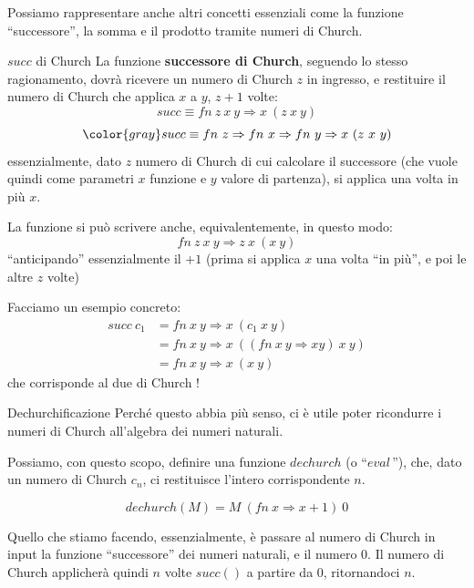 \documentclass[a4paper,11pt]{report}
\begin{document}
Possiamo rappresentare anche altri concetti essenziali come la funzione ``successore'', la somma e il prodotto tramite numeri di Church.

\begin{defframe}{\( succ \) di Church}{}
    La funzione \textbf{successore di Church}, seguendo lo stesso ragionamento, dovrà ricevere un numero di Church \( z \) in ingresso, e restituire il numero di Church che applica \( x \) a \( y \), \( z+1 \) volte:
    \[ succ \equiv fn \ z \ x \ y \Rightarrow x\ (z \ x \ y) \]
    \[\color{gray} succ \equiv fn \ z \Rightarrow fn \ x \Rightarrow fn \ y \Rightarrow x\ (z \ x \ y) \]
    essenzialmente, dato \( z \) numero di Church di cui calcolare il successore (che vuole quindi come parametri \( x \) funzione e \( y \) valore di partenza), si applica una volta in più \( x \).

    La funzione si può scrivere anche, equivalentemente, in questo modo:
    \[ fn \ z \ x \ y \Rightarrow z \ x \ (x \ y) \]
    ``anticipando'' essenzialmente il \( +1 \) (prima si applica \( x \) una volta ``in più'', e poi le altre \( z \) volte)
\end{defframe}

Facciamo un esempio concreto:
\begin{align*}
    succ \ c_1 &= fn \ x \ y \Rightarrow x \ (c_1 \ x \ y) \\
               & = fn \ x \ y \Rightarrow x \ (( fn \ x \ y \Rightarrow xy) \ x \ y ) \\
               & = fn \ x \ y \Rightarrow x \ ( x \ y)
\end{align*}
che corrisponde al due di Church !

\begin{defframe}{Dechurchificazione}{}
    Perché questo abbia più senso, ci è utile poter ricondurre i numeri di Church all'algebra dei numeri naturali.
    
    Possiamo, con questo scopo, definire una funzione \( dechurch \) (o ``\( eval \,\)''), che, dato un numero di Church \( c_n \), ci restituisce l'intero corrispondente \( n \).

    \[ dechurch(M) = M \ (fn \ x \Rightarrow x+1) \ 0 \]

    \begin{gframe}{}
    Quello che stiamo facendo, essenzialmente, è passare al numero di Church in input la funzione ``successore'' dei numeri naturali, e il numero \( 0 \). Il numero di Church applicherà quindi \( n \) volte \( succ() \) a partire da \( 0 \), ritornandoci \( n \).
    \end{gframe}
\end{defframe}
\end{document}
